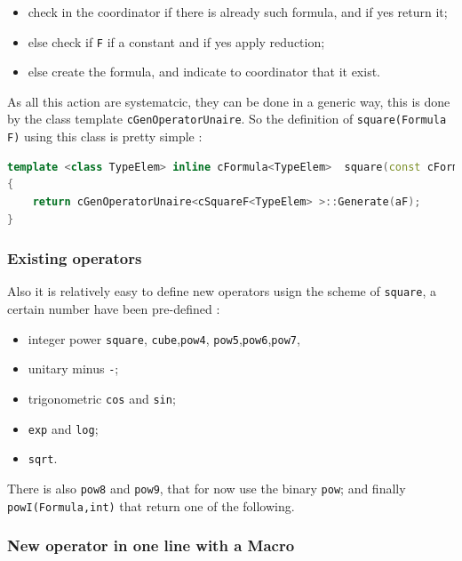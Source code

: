 \begin{itemize}
    \item  check in the coordinator if there is already such formula, and if yes return it;
    \item  else check if  {\tt F} if a constant and if yes apply reduction;
    \item  else create the formula, and indicate to coordinator that it exist.
\end{itemize}

As all this action are systematcic, they can be done in  a generic way, this is done by the class 
template {\tt cGenOperatorUnaire}. So the definition of {\tt square(Formula F)} using this class
is pretty simple :

\begin{lstlisting}[language=c++]
template <class TypeElem> inline cFormula<TypeElem>  square(const cFormula<TypeElem> & aF)
{
    return cGenOperatorUnaire<cSquareF<TypeElem> >::Generate(aF);
}
\end{lstlisting}

\subsubsection{Existing operators}

Also it is relatively easy to define new operators usign the scheme of {\tt  square}, a certain number have been
pre-defined :

\begin{itemize}
    \item integer power {\tt square}, {\tt cube},{\tt pow4}, {\tt pow5},{\tt pow6},{\tt pow7},
     \item unitary minus {\tt -};
     \item trigonometric {\tt cos} and  {\tt sin};
     \item {\tt exp} and  {\tt log};
     \item {\tt sqrt}.
\end{itemize}

There is also {\tt pow8} and {\tt pow9}, that for now use the binary {\tt pow};
and finally {\tt powI(Formula,int)} that return one of the following.

\subsubsection{New operator in one line with a Macro}

